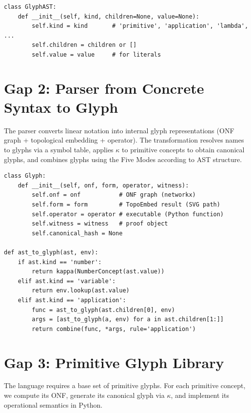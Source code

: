 \documentclass[12pt, letterpaper]{book}
\begin{document}
\begin{verbatim}
class GlyphAST:
    def __init__(self, kind, children=None, value=None):
        self.kind = kind       # 'primitive', 'application', 'lambda', ...
        self.children = children or []
        self.value = value     # for literals
\end{verbatim}

\section{Gap 2: Parser from Concrete Syntax to Glyph}

The parser converts linear notation into internal glyph representations (ONF graph + topological embedding + operator). The transformation resolves names to glyphs via a symbol table, applies $\kappa$ to primitive concepts to obtain canonical glyphs, and combines glyphs using the Five Modes according to AST structure.

\begin{verbatim}
class Glyph:
    def __init__(self, onf, form, operator, witness):
        self.onf = onf           # ONF graph (networkx)
        self.form = form         # TopoEmbed result (SVG path)
        self.operator = operator # executable (Python function)
        self.witness = witness   # proof object
        self.canonical_hash = None

def ast_to_glyph(ast, env):
    if ast.kind == 'number':
        return kappa(NumberConcept(ast.value))
    elif ast.kind == 'variable':
        return env.lookup(ast.value)
    elif ast.kind == 'application':
        func = ast_to_glyph(ast.children[0], env)
        args = [ast_to_glyph(a, env) for a in ast.children[1:]]
        return combine(func, *args, rule='application')
\end{verbatim}

\section{Gap 3: Primitive Glyph Library}

The language requires a base set of primitive glyphs. For each primitive concept, we compute its ONF, generate its canonical glyph via $\kappa$, and implement its operational semantics in Python.
\end{document}
